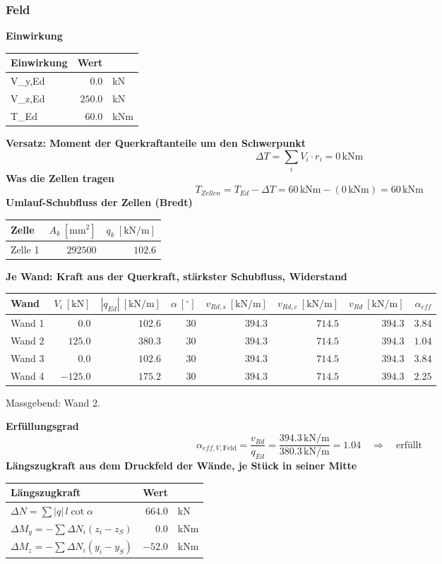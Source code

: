 \documentclass[11pt,a4paper]{article}
\begin{document}
\subsubsection{Feld}
\noindent\textbf{Einwirkung}
\begin{longtable}{lrl}
\hline
Einwirkung & Wert &  \\
\hline
\endhead
V\_y,Ed & $0.0$ & kN \\
V\_z,Ed & $250.0$ & kN \\
T\_Ed & $60.0$ & kNm \\
\hline
\end{longtable}
\noindent\textbf{Versatz: Moment der Querkraftanteile um den Schwerpunkt}
\begin{equation*}
\Delta T = \sum_i V_i \cdot r_i = 0\,\mathrm{kNm}
\end{equation*}
\noindent\textbf{Was die Zellen tragen}
\begin{equation*}
T_{Zellen} = T_{Ed} - \Delta T = 60\,\mathrm{kNm} - \left(0\,\mathrm{kNm}\right) = 60\,\mathrm{kNm}
\end{equation*}
\noindent\textbf{Umlauf-Schubfluss der Zellen (Bredt)}
\begin{longtable}{lrr}
\hline
Zelle & $A_k\ [\mathrm{mm}^2]$ & $q_k\ [\mathrm{kN/m}]$ \\
\hline
\endhead
Zelle 1 & $292500$ & $102.6$ \\
\hline
\end{longtable}
\noindent\textbf{Je Wand: Kraft aus der Querkraft, stärkster Schubfluss, Widerstand}
\begin{longtable}{lrrrrrrr}
\hline
Wand & $V_i\ [\mathrm{kN}]$ & $|q_{Ed}|\ [\mathrm{kN/m}]$ & $\alpha\ [{}^{\circ}]$ & $v_{Rd,s}\ [\mathrm{kN/m}]$ & $v_{Rd,c}\ [\mathrm{kN/m}]$ & $v_{Rd}\ [\mathrm{kN/m}]$ & $\alpha_{eff}$ \\
\hline
\endhead
Wand 1 & $0.0$ & $102.6$ & $30$ & $394.3$ & $714.5$ & $394.3$ & $3.84$ \\
Wand 2 & $125.0$ & $380.3$ & $30$ & $394.3$ & $714.5$ & $394.3$ & $1.04$ \\
Wand 3 & $0.0$ & $102.6$ & $30$ & $394.3$ & $714.5$ & $394.3$ & $3.84$ \\
Wand 4 & $-125.0$ & $175.2$ & $30$ & $394.3$ & $714.5$ & $394.3$ & $2.25$ \\
\hline
\end{longtable}
Massgebend: Wand 2.

\noindent\textbf{Erfüllungsgrad}
\begin{equation*}
\alpha_{eff,V,\text{Feld}} = \frac{v_{Rd}}{q_{Ed}} = \frac{394.3\,\mathrm{kN}/\mathrm{m}}{380.3\,\mathrm{kN}/\mathrm{m}} = 1.04 \quad \Rightarrow \quad \text{erfüllt}
\end{equation*}
\noindent\textbf{Längszugkraft aus dem Druckfeld der Wände, je Stück in seiner Mitte}
\begin{longtable}{lrl}
\hline
Längszugkraft & Wert &  \\
\hline
\endhead
$\Delta N = \sum |q|\, l \cot\alpha$ & $664.0$ & kN \\
$\Delta M_y = -\sum \Delta N_i (z_i - z_S)$ & $0.0$ & kNm \\
$\Delta M_z = -\sum \Delta N_i (y_i - y_S)$ & $-52.0$ & kNm \\
\hline
\end{longtable}
\end{document}
